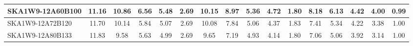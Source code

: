 \begin{table}[H]
{{\begin{tabular}{|lccccc||ccccc||ccccc|}
SKA1W9-12A60B100 & 11.16 \cellcolor{blue!51.31} & 10.86 \cellcolor{red!60.00} & 6.56 \cellcolor{green!45.78} & 5.48 \cellcolor{orange!57.16} & 2.69 \cellcolor{purple!21.82} & 10.15 \cellcolor{blue!60.00} & 8.97 \cellcolor{red!54.49} & 5.36 \cellcolor{green!51.51} & 4.72 \cellcolor{orange!50.48} & 1.80 \cellcolor{purple!28.50} & 8.18 \cellcolor{blue!53.76} & 6.13 \cellcolor{red!46.07} & 4.42 \cellcolor{green!46.77} & 4.00 \cellcolor{orange!53.41} & 0.99 \cellcolor{purple!18.00}\\ \hline 
SKA1W9-12A72B120 & 11.70 \cellcolor{blue!58.31} & 10.14 \cellcolor{red!51.94} & 5.84 \cellcolor{green!30.28} & 5.07 \cellcolor{orange!33.89} & 2.69 \cellcolor{purple!21.82} & 10.08 \cellcolor{blue!58.90} & 7.84 \cellcolor{red!40.65} & 5.06 \cellcolor{green!38.11} & 4.37 \cellcolor{orange!30.88} & 1.83 \cellcolor{purple!39.00} & 7.41 \cellcolor{blue!42.04} & 5.34 \cellcolor{red!30.56} & 4.22 \cellcolor{green!35.26} & 3.38 \cellcolor{orange!27.88} & 1.00 \cellcolor{purple!25.00}\\ \hline 
SKA1W9-12A80B133 & 11.83 \cellcolor{blue!60.00} & 9.58 \cellcolor{red!45.66} & 5.63 \cellcolor{green!25.75} & 4.99 \cellcolor{orange!29.35} & 2.69 \cellcolor{purple!21.82} & 9.65 \cellcolor{blue!52.16} & 7.19 \cellcolor{red!32.69} & 4.93 \cellcolor{green!32.30} & 4.14 \cellcolor{orange!18.00} & 1.80 \cellcolor{purple!28.50} & 7.06 \cellcolor{blue!36.72} & 5.06 \cellcolor{red!25.07} & 3.92 \cellcolor{green!18.00} & 3.14 \cellcolor{orange!18.00} & 1.00 \cellcolor{purple!25.00}\\ \hline 
\end{tabular}}
\vspace{-0.300000cm}
\hspace{1cm} 
}
\end{table}
